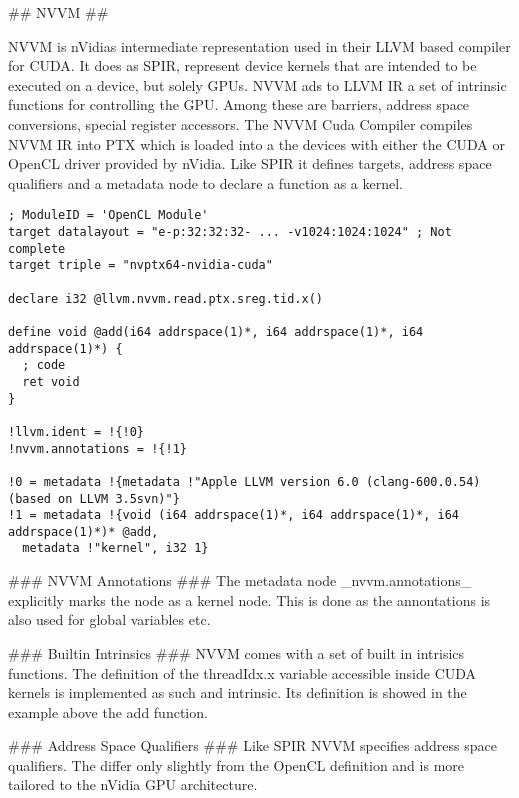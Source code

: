 \begin{markdown}
## NVVM ##

NVVM is nVidias intermediate representation used in their LLVM based
compiler for CUDA. It does as SPIR, represent device kernels that are
intended to be executed on a device, but solely GPUs. NVVM ads to LLVM
IR a set of intrinsic functions for controlling the GPU. Among these
are barriers, address space conversions, special register
accessors. The NVVM Cuda Compiler compiles NVVM IR into PTX which is
loaded into a the devices with either the CUDA or OpenCL driver
provided by nVidia. Like SPIR it defines targets, address space
qualifiers and a metadata node to declare a function as a kernel.

\begin{verbatim}
; ModuleID = 'OpenCL Module'
target datalayout = "e-p:32:32:32- ... -v1024:1024:1024" ; Not complete
target triple = "nvptx64-nvidia-cuda"

declare i32 @llvm.nvvm.read.ptx.sreg.tid.x()

define void @add(i64 addrspace(1)*, i64 addrspace(1)*, i64 addrspace(1)*) {
  ; code
  ret void
}

!llvm.ident = !{!0}
!nvvm.annotations = !{!1}

!0 = metadata !{metadata !"Apple LLVM version 6.0 (clang-600.0.54) (based on LLVM 3.5svn)"}
!1 = metadata !{void (i64 addrspace(1)*, i64 addrspace(1)*, i64 addrspace(1)*)* @add,
  metadata !"kernel", i32 1}
\end{verbatim}

### NVVM Annotations ###
The metadata node _nvvm.annotations_ explicitly marks the node as a
kernel node. This is done as the annontations is also used for global
variables etc. 

### Builtin Intrinsics ###
NVVM comes with a set of built in intrisics functions. The definition
of the threadIdx.x variable accessible inside CUDA kernels is
implemented as such and intrinsic. Its definition is showed in the
example above the add function. 

### Address Space Qualifiers ###
Like SPIR NVVM specifies address space qualifiers. The differ only
slightly from the OpenCL definition and is more tailored to the nVidia
GPU architecture.




\end{markdown}
